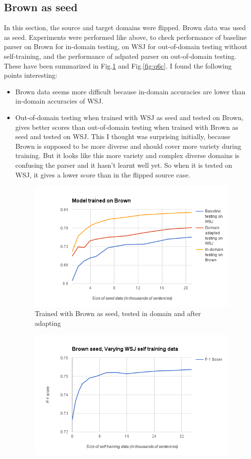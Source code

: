 \documentclass{article}
\begin{document}
\subsection{Brown as seed}
In this section, the source and target domains were flipped. Brown data was used as seed. Experiments were performed like above, to check performance of baseline parser on Brown for in-domain testing, on WSJ for out-of-domain testing without self-training, and the performance of adpated parser on out-of-domain testing. These have been summarized in Fig.\ref{fig:q6_3} and Fig.\ref{fig:q6c}. I found the following points interesting:
\begin{itemize}
  \item Brown data seems more difficult because in-domain accuracies are lower than in-domain accuracies of WSJ.
  \item Out-of-domain testing when trained with WSJ as seed and tested on Brown, gives better scores than out-of-domain testing when trained with Brown as seed and tested on WSJ. This I thought was surprising initially, because Brown is supposed to be more diverse and should cover more variety during training. But it looks like this more variety and complex diverse domains is confusing the parser and it hasn't learnt well yet. So when it is tested on WSJ, it gives a lower score than in the flipped source case.
  \begin{figure}[h]
   \centering
    \includegraphics[width=0.75\linewidth]{plots/q6_3.png}
    \caption{Trained with Brown as seed, tested in domain and after adapting}
   \label{fig:q6_3}
\end{figure}
\begin{figure}[h]
  \vspace{-0.2in}
   \centering
    \includegraphics[width=0.75\linewidth]{plots/q6c.png}

\end{figure}
\end{itemize}
\end{document}
